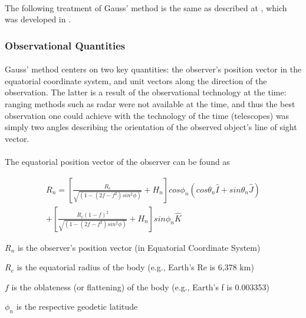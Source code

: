 \documentclass[11pt,twoside,letterpaper]{article}
\begin{document}
  \paragraph{}
  The following treatment of Gauss' method is the same as described at
  \cite{Wikipedia_2018}, which was developed in \cite{curtis_2014}.

  \subsubsection {Observational Quantities}
  \paragraph{}
  Gauss' method centers on two key quantities: the observer's position
  vector in the equatorial coordinate system, and unit vectors along
  the direction of the observation. The latter is a result of the
  observational technology at the time: ranging methods such as radar
  were not available at the time, and thus the best observation one
  could achieve with the technology of the time (telescopes) was
  simply two angles describing the orientation of the observed
  object's line of sight vector. 

  \paragraph{}
  The equatorial position vector of the observer can be found as
 

  \begin{equation} \label{obsPos}
    \begin{split}
      R_n =
      \left[
        \frac{R_e}{\sqrt{(1 - (2f -f^2)sin^2\phi)}} + H_n
        \right]cos\phi_n(cos\theta_n\hat{I} + sin\theta_n\hat{J}) \\+
      \left[
        \frac{R_e(1 - f)^2}{\sqrt{(1 - (2f -f^2)sin^2\phi)}} + H_n
        \right]sin\phi_n\hat{K}
    \end{split}
  \end{equation}

  \(R_n\) is the observer's position vector (in Equatorial Coordinate System)
  
  \(R_e\) is the equatorial radius of the body (e.g., Earth's Re is 6,378 km)
  
  \(f\) is the oblateness (or flattening) of the body (e.g., Earth's f is 0.003353)
  
  \(\phi_n\) is the respective geodetic latitude
  
\end{document}
